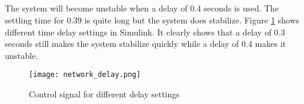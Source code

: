 
\subsection{}
The system will become unstable when a delay of 0.4 seconds is used. The settling time for 0.39 is quite long but the system does stabilize. Figure \ref{fig:network_delay} shows different time delay settings in Simulink. It clearly shows that a delay of 0.3 seconds still makes the system stabilize quickly while a delay of 0.4 makes it unstable.

\begin{center}
      \begin{figure}[H]
      \centering
        \texttt{[image: network\_delay.png]}
        
      \caption{Control signal for different delay settings}
      \label{fig:network_delay}
      
      \end{figure}
    \end{center}
    
